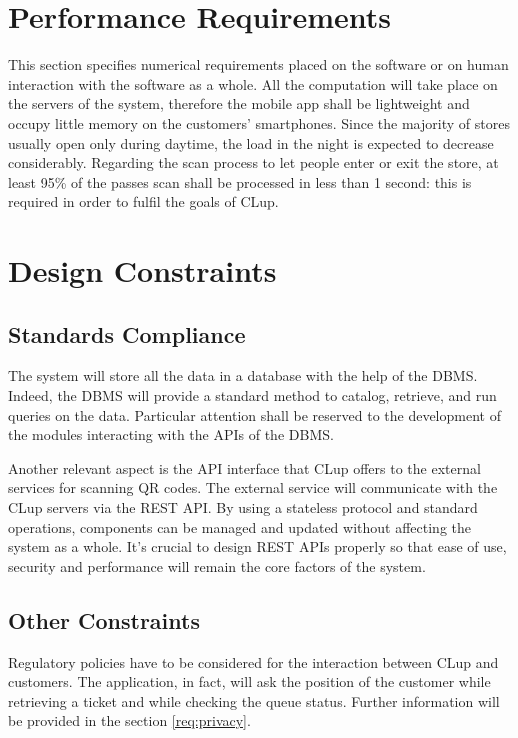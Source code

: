 \section{Performance Requirements}
This section specifies numerical requirements placed on the software or on human interaction with the software as a whole.\newline
All the computation will take place on the servers of the system, therefore the mobile app shall be lightweight and occupy little memory on the customers' smartphones.
Since the majority of stores usually open only during daytime, the load in the night is expected to decrease considerably.
Regarding the scan process to let people enter or exit the store, at least 95\% of the passes scan shall be processed in less than 1 second: this is required in order to fulfil the goals of CLup.

\section{Design Constraints}

\subsection{Standards Compliance}
The system will store all the data in a database with the help of the DBMS. Indeed, the DBMS will provide a standard method to catalog, retrieve, and run queries on the data. Particular attention shall be reserved to the development of the modules interacting with the APIs of the DBMS.

Another relevant aspect is the API interface that CLup offers to the external services for scanning QR codes. The external service will communicate with the CLup servers via the REST API. By using a stateless protocol and standard operations, components can be managed and updated without affecting the system as a whole.\newline
It’s crucial to design REST APIs properly so that ease of use, security and performance will remain the core factors of the system.

\subsection{Other Constraints}
Regulatory policies have to be considered for the interaction between CLup and customers. The application, in fact, will ask the position of the customer while retrieving a ticket and while checking the queue status. Further information will be provided in the section \ref{req:privacy}.

